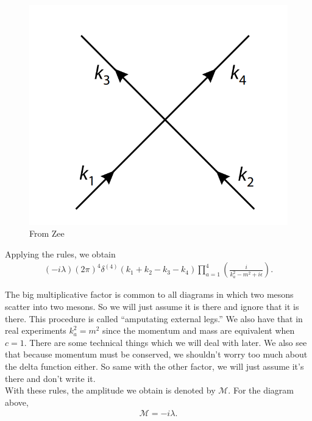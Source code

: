 \documentclass{book}
\theoremstyle{definition}
\newcommand{\f}[2]{\frac{#1}{#2}}
\newcommand{\lp}{\left(}
\newcommand{\rp}{\right)}
\begin{document}
\begin{figure}[!htb]
	\centering
	\includegraphics[scale=0.3]{momentum-propagator}
	\caption{From Zee}
\end{figure}

Applying the rules, we obtain
\begin{align}
(-i\lambda)(2\pi)^4\delta^{(4)}(k_1 + k_2 - k_3 - k_4)\prod^4_{a=1}\lp \f{i}{k_a^2 - m^2 + i\epsilon} \rp.
\end{align}

The big multiplicative factor is common to all diagrams in which two mesons scatter into two mesons. So we will just assume it is there and ignore that it is there. This procedure is called ``amputating external legs.'' We also have that in real experiments $k_a^2 = m^2$ since the momentum and mass are equivalent when $c=1$. There are some technical things which we will deal with later. We also see that because momentum must be conserved, we shouldn't worry too much about the delta function either. So same with the other factor, we will just assume it's there and don't write it. \\

With these rules, the amplitude we obtain is denoted by $\mathcal{M}$. For the diagram above, 
\begin{align}
\mathcal{M} = -i\lambda.
\end{align}
\end{document}
